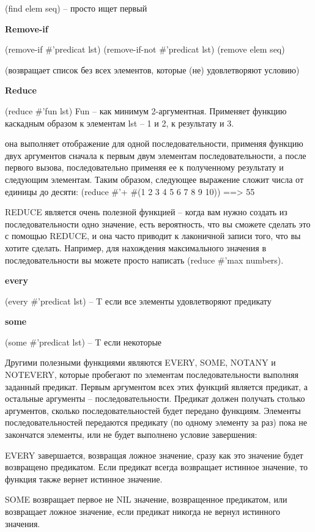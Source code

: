 \documentclass[12pt]{report}
\begin{document}
(find elem seq) -- просто ищет первый

\textbf{Remove-if}

(remove-if \#’predicat lst)
(remove-if-not \#’predicat lst)
(remove elem seq)

(возвращает список без всех элементов, которые (не) удовлетворяют условию)

\textbf{Reduce}

(reduce \#’fun lst)
Fun – как минимум 2-аргументная. Применяет функцию каскадным образом к элементам lst – 1 и 2, к результату и 3.


она выполняет отображение для одной последовательности, применяя функцию двух аргументов сначала к первым двум элементам последовательности, а после первого вызова, последовательно применяя ее к полученному результату и следующим элементам. Таким образом, следующее выражение сложит числа от единицы до десяти: (reduce \#'+ \#(1 2 3 4 5 6 7 8 9 10)) ==> 55

REDUCE является очень полезной функцией – когда вам нужно создать из последовательности одно значение, есть вероятность, что вы сможете сделать это с помощью REDUCE, и она часто приводит к лаконичной записи того, что вы хотите сделать. Например, для нахождения максимального значения в последовательности вы можете просто написать (reduce \#'max numbers). 


\textbf{every}

(every \#’predicat lst) – T если все элементы удовлетворяют предикату

\textbf{some}

(some \#’predicat lst) – T если некоторые

Другими полезными функциями являются EVERY, SOME, NOTANY и NOTEVERY, которые пробегают по элементам последовательности выполняя заданный предикат. Первым аргументом всех этих функций является предикат, а остальные аргументы – последовательности. Предикат должен получать столько аргументов, сколько последовательностей будет передано функциям. Элементы последовательностей передаются предикату (по одному элементу за раз) пока не закончатся элементы, или не будет выполнено условие завершения: 

EVERY завершается, возвращая ложное значение, сразу как это значение будет возвращено предикатом. Если предикат всегда возвращает истинное значение, то функция также вернет истинное значение.

SOME возвращает первое не NIL значение, возвращенное предикатом, или возвращает ложное значение, если предикат никогда не вернул истинного значения. 
\end{document}
